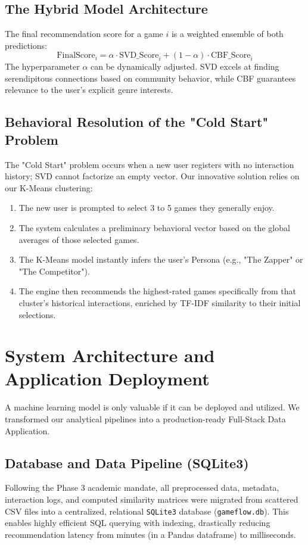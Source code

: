 \documentclass[12pt, a4paper]{report}
\begin{document}
\section{The Hybrid Model Architecture}
The final recommendation score for a game $i$ is a weighted ensemble of both predictions:
\[ \text{FinalScore}_i = \alpha \cdot \text{SVD\_Score}_i + (1 - \alpha) \cdot \text{CBF\_Score}_i \]
The hyperparameter $\alpha$ can be dynamically adjusted. SVD excels at finding serendipitous connections based on community behavior, while CBF guarantees relevance to the user's explicit genre interests.

\section{Behavioral Resolution of the "Cold Start" Problem}
The "Cold Start" problem occurs when a new user registers with no interaction history; SVD cannot factorize an empty vector.
Our innovative solution relies on our K-Means clustering:
\begin{enumerate}
    \item The new user is prompted to select 3 to 5 games they generally enjoy.
    \item The system calculates a preliminary behavioral vector based on the global averages of those selected games.
    \item The K-Means model instantly infers the user's Persona (e.g., "The Zapper" or "The Competitor").
    \item The engine then recommends the highest-rated games specifically from that cluster's historical interactions, enriched by TF-IDF similarity to their initial selections.
\end{enumerate}

\chapter{System Architecture and Application Deployment}
A machine learning model is only valuable if it can be deployed and utilized. We transformed our analytical pipelines into a production-ready Full-Stack Data Application.

\section{Database and Data Pipeline (SQLite3)}
Following the Phase 3 academic mandate, all preprocessed data, metadata, interaction logs, and computed similarity matrices were migrated from scattered CSV files into a centralized, relational \texttt{SQLite3} database (\texttt{gameflow.db}). This enables highly efficient SQL querying with indexing, drastically reducing recommendation latency from minutes (in a Pandas dataframe) to milliseconds.
\end{document}
